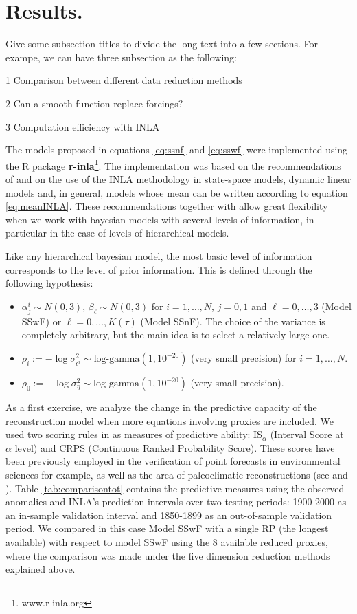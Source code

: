 \documentclass[11pt]{amsart}
\theoremstyle{plain}
\theoremstyle{definition}
\theoremstyle{remark}
\begin{document}
\section{Results.}
\label{sec:results}
Give some subsection titles to divide the long text into a few sections. For exampe, we can have three subsection as the following:

1 Comparison between different data reduction methods

2 Can a smooth function replace forcings?

3 Computation efficiency with INLA


The models proposed in equations \eqref{eq:ssnf} and \eqref{eq:sswf} were
implemented using the R package \textbf{r-inla}\footnote{www.r-inla.org}. The
implementation was based on the recommendations of \cite{Ruiz-Cardenas2012} and
\cite{Muff2015} on the use of the INLA methodology in state-space models,
dynamic linear models and, in general, models whose mean can be written
according to equation \eqref{eq:meanINLA}. These
recommendations together with \cite{Martins2013} allow
great flexibility when we work with bayesian models with several levels of
information, in particular in the case of levels of hierarchical models.

Like any hierarchical bayesian model, the most basic level of information
corresponds to the level of prior information. This is defined through the
following hypothesis:
\begin{itemize}
\item $\alpha^i_j\sim N(0,3)$, $\beta_\ell \sim N(0,3)$ for $i=1,\ldots,N$, $j=0,1$ and $\ell=0,\ldots,3$
  (Model SSwF) or $\ell=0,\ldots,K(\tau)$ (Model SSnF). The choice of the variance is
  completely arbitrary, but the main idea is to select a relatively large one.
  
\item $\rho_i := -\log \sigma^2_{\epsilon^i}\sim \text{log-gamma}(1,10^{-20})$
  (very small precision) for $i=1,\ldots,N$.
  
\item $\rho_0 := -\log \sigma^2_\eta \sim \text{log-gamma}(1,10^{-20})$ (very
  small precision).
\end{itemize}

As a first exercise, we analyze the change in the predictive capacity of the
reconstruction model when more equations involving proxies are included. We used
two scoring rules in \cite{Gneiting2007a} as measures of predictive ability:
IS$_\alpha$ (Interval Score at $\alpha$ level) and CRPS (Continuous Ranked
Probability Score). These scores have been previously employed in the
verification of point forecasts in environmental sciences for example, as well as the area
of paleoclimatic reconstructions (see \cite{Barboza2014} and
\cite{Scheuerer2014}). Table \ref{tab:comparisontot} contains the predictive
measures using the observed anomalies and INLA's prediction intervals over two
testing periods: 1900-2000 as an in-sample validation interval and 1850-1899 as an
out-of-sample validation period. We compared in this case Model SSwF with a single RP
(the longest available) with respect to model SSwF using the 8 available reduced
proxies, where the comparison was made under the five dimension reduction
methods explained above.
\end{document}
